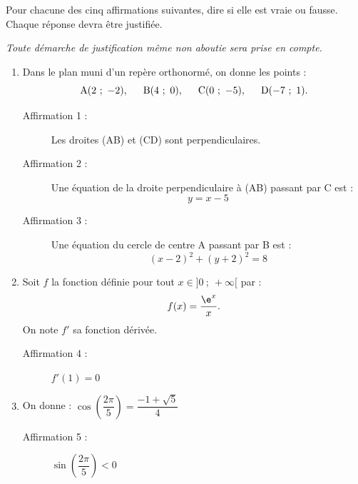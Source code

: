 \medskip

Pour chacune des cinq affirmations suivantes, dire si elle est vraie ou fausse. Chaque réponse devra être justifiée.

\emph{Toute démarche de justification même non aboutie sera prise en compte.}

\medskip

\begin{enumerate}
\item  Dans le plan muni d'un repère orthonormé, on donne les points :
\[\text{A}(2~;~-2), \hspace{1.5em}\text{B}(4~;~0),\hspace{1.5em} \text{C}(0~;~-5),\hspace{1.5em} \text{D}(-7~;~1).\]
\begin{description}
\item[Affirmation 1 :] Les droites (AB) et (CD) sont perpendiculaires.
\item[Affirmation 2 :] Une équation de la droite perpendiculaire à (AB) passant par C est : \[y = x-5\]
\item [Affirmation 3 :] Une équation du cercle de centre A passant par B est : \[(x - 2)^2+(y + 2)^2 = 8\]
\end{description}
\item Soit $f$ la fonction définie pour tout $x\in]0~;~+\infty[$ par : \[f(x)=\frac{\e^x}{x}.\]
 On note $f'$ sa fonction dérivée.
\begin{description}
\item[Affirmation 4 :] $f'(1) = 0$
\end{description}
\item On donne : $\cos\left(\dfrac{2\pi}{5}\right)=\dfrac{-1+\sqrt{5}}{4}$
\begin{description}
\item[Affirmation 5 :] $\sin\left(\dfrac{2\pi}{5}\right)< 0$
\end{description}
\end{enumerate}

\vspace{1cm}
